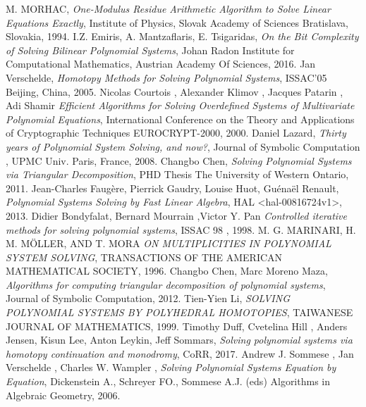 \documentclass[11pt]{article}
\begin{document}
\begin{thebibliography}{1}
   M. MORHAC,
  \textit{One-Modulus Residue Arithmetic Algorithm to Solve Linear Equations Exactly},
   Institute of Physics, Slovak Academy of Sciences
   Bratislava, Slovakia,
   1994.
  I.Z. Emiris, A. Mantzaflaris, E. Tsigaridas,
  \textit{On the Bit Complexity of Solving Bilinear Polynomial Systems},
   Johan Radon Institute for Computational Mathematics,
   Austrian Academy Of Sciences,
   2016.
  Jan Verschelde,
  \textit{Homotopy Methods for Solving Polynomial Systems},
   ISSAC’05
   Beijing, China,
   2005.
  Nicolas Courtois , Alexander Klimov  , Jacques Patarin ,  Adi Shamir
  \textit{Efficient Algorithms for Solving Overdefined Systems of Multivariate Polynomial Equations},
   International Conference on the Theory and Applications of Cryptographic Techniques
   EUROCRYPT-2000,
   2000.
  Daniel Lazard,
  \textit{Thirty years of Polynomial System Solving, and now?},
   Journal of Symbolic Computation ,
   UPMC Univ. Paris, France,
   2008.
  Changbo Chen,
  \textit{Solving Polynomial Systems via Triangular Decomposition},
   PHD Thesis
   The University of Western Ontario,
   2011.
  Jean-Charles Faugère, Pierrick Gaudry, Louise Huot, Guénaël Renault,
  \textit{Polynomial Systems Solving by Fast Linear Algebra},
   HAL <hal-00816724v1>,
   2013.
  Didier Bondyfalat, Bernard Mourrain ,Victor Y. Pan
  \textit{Controlled iterative methods for solving polynomial systems},
   ISSAC 98 ,
   1998.
  M. G. MARINARI, H. M. MÖLLER, AND T. MORA
  \textit{ON MULTIPLICITIES IN POLYNOMIAL SYSTEM SOLVING},
   TRANSACTIONS OF THE AMERICAN MATHEMATICAL SOCIETY,
   1996.
  Changbo Chen, Marc Moreno Maza,
  \textit{Algorithms for computing triangular decomposition of polynomial systems},
   Journal of Symbolic Computation,
   2012.
  Tien-Yien Li,
  \textit{SOLVING POLYNOMIAL SYSTEMS BY POLYHEDRAL HOMOTOPIES},
   TAIWANESE JOURNAL OF MATHEMATICS,
   1999.
  Timothy Duff, Cvetelina Hill , Anders Jensen, Kisun Lee, Anton Leykin, Jeff Sommars,
  \textit{Solving polynomial systems via homotopy continuation and monodromy},
   CoRR,
   2017.
  Andrew J. Sommese , Jan Verschelde , Charles W. Wampler ,
  \textit{Solving Polynomial Systems Equation by Equation},
   Dickenstein A., Schreyer FO., Sommese A.J. (eds) Algorithms in Algebraic Geometry,
   2006.

\end{thebibliography}
\end{document}
